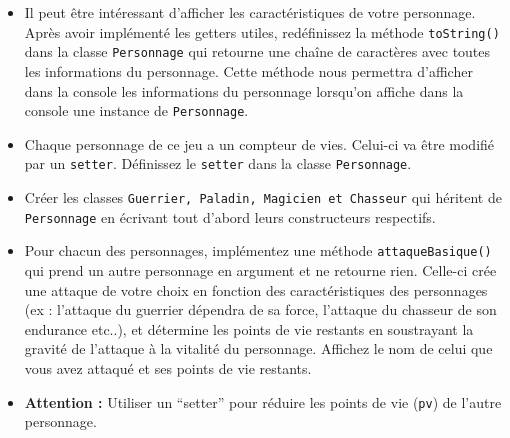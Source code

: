 \begin{Exercice}[15 minutes]
\begin{itemize}
       \item Il peut être intéressant d’afficher les caractéristiques de votre personnage. Après avoir implémenté les getters utiles, redéfinissez la méthode \lstinline{toString()} dans la classe \lstinline{Personnage} qui retourne une chaîne de caractères avec toutes les informations du 
       personnage. Cette méthode nous permettra d'afficher dans la console les informations du personnage lorsqu'on affiche dans la console une instance de \lstinline{Personnage}.

        \item Chaque personnage de ce jeu a un compteur de vies. Celui-ci va être modifié par un \lstinline{setter}. Définissez le \lstinline{setter} dans la classe \lstinline{Personnage}.
        \item Créer les classes \lstinline{Guerrier, Paladin, Magicien et Chasseur} qui héritent de \lstinline{Personnage} en écrivant tout d’abord leurs constructeurs respectifs. 
        
        
    
        \item Pour chacun des personnages, implémentez une méthode \lstinline{attaqueBasique()} qui prend un autre personnage en argument et ne retourne rien. Celle-ci crée une attaque de votre choix en fonction des caractéristiques des personnages (ex : l’attaque du guerrier dépendra de sa force, l’attaque du chasseur de son endurance etc..), et détermine les points de vie restants en soustrayant la gravité de l'attaque à la vitalité du personnage. Affichez le nom de celui que vous avez attaqué et ses points de vie restants.
        \item \textbf{Attention :} Utiliser un ``setter'' pour réduire les points de vie (\lstinline{pv}) de l’autre personnage.
        
        
    \end{itemize}
    

\end{Exercice}
